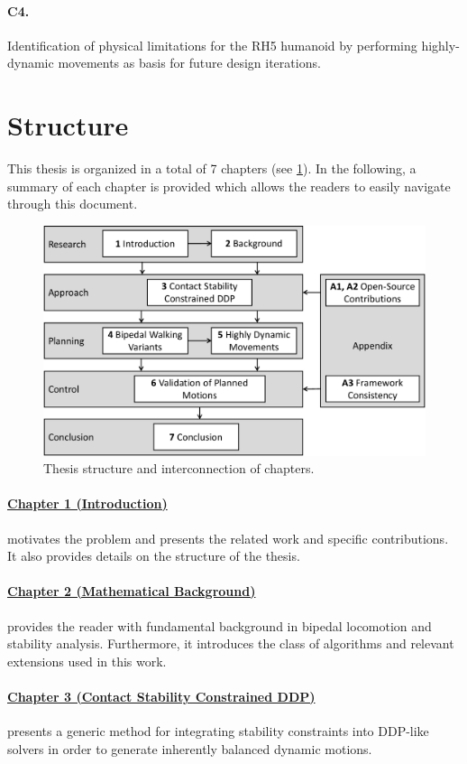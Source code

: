 \paragraph{C4.} Identification of physical limitations for the RH5 humanoid by performing highly-dynamic movements as basis for future design iterations.   

\section{Structure}
This thesis is organized in a total of 7 chapters (see \cref{img:structure}). 
In the following, a summary of each chapter is provided which allows the readers to easily navigate through this document.

\begin{figure}
\centering	
\includegraphics[width=.8\textwidth]{img/structure}
\caption[Thesis structure and interconnection of chapters]{Thesis structure and interconnection of chapters.}
\label{img:structure}
\end{figure}

\paragraph{\hyperref[c1]{Chapter 1 (Introduction)}} motivates the problem and presents the related work and specific contributions. It also provides details on the structure of the thesis.
\paragraph{\hyperref[c2]{Chapter 2 (Mathematical Background)}} provides the reader with fundamental background in bipedal locomotion and stability analysis. Furthermore, it introduces the class of algorithms and relevant extensions used in this work.
\paragraph{\hyperref[c3]{Chapter 3 (Contact Stability Constrained DDP)}} presents a generic method for integrating stability constraints into DDP-like solvers in order to generate inherently balanced dynamic motions.
